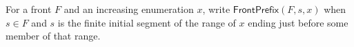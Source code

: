 \begin{definition}
For a front $F$ and an increasing enumeration $x$, write
\(\mathsf{FrontPrefix}(F,s,x)\) when $s\in F$ and $s$ is the finite initial
segment of the range of $x$ ending just before some member of that range.
\end{definition}
